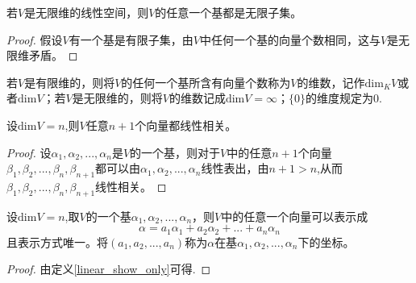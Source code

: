 \documentclass[blue,normal,cn]{elegantnote}
\begin{document}
\begin{corollary}
    若$V$是无限维的线性空间，则$V$的任意一个基都是无限子集。 
\end{corollary}

\begin{proof} 
    假设$V$有一个基是有限子集，由$V$中任何一个基的向量个数相同，这与$V$是无限维矛盾。
\end{proof}


\begin{definition}
    若$V$是有限维的，则将$V$的任何一个基所含有向量个数称为$V$的维数，记作$\mathrm{dim}_K V$或者$\mathrm{dim} V$；若$V$是无限维的，则将$V$的维数记成$\mathrm{dim} V=∞$；$\{0\}$的维度规定为0.
\end{definition}

\begin{proposition}
    \label{12}
    设$\mathrm{dim} V=n$,则$V$任意$n+1$个向量都线性相关。
\end{proposition}

\begin{proof}
    设$α_1,α_2,...,α_n$是$V$的一个基，则对于$V$中的任意$n+1$个向量$β_1,β_2,...,β_n,β_{n+1}$都可以由$α_1,α_2,...,α_n$线性表出，由$n+1>n$,从而$β_1,β_2,...,β_n,β_{n+1}$线性相关。
\end{proof}

\begin{definition}
    设$\mathrm{dim} V=n$,取$V$的一个基$α_1,α_2,...,α_n$，则$V$中的任意一个向量可以表示成
    $$
        α=a_1 α_1+a_2  α_2+...+a_n  α_n
    $$
    且表示方式唯一。将$(a_1,a_2,...,a_n)$称为$α$在基$α_1,α_2,...,α_n$下的坐标。
\end{definition}

\begin{proof}
    由定义\ref{linear_show_only}可得.
\end{proof}
\end{document}
